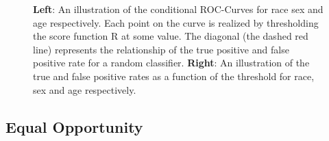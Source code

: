 \documentclass[11pt, fleqn, titlepage]{article}
\begin{document}
\begin{figure}[H]
\begin{subfigure}{0.5\textwidth}
		\end{subfigure}
		\caption{\textbf{Left}: An illustration of the conditional ROC-Curves for race sex and age respectively. Each point on the curve is realized by thresholding the score function R at some value. The diagonal (the dashed red line) represents the relationship of the true positive and false positive rate for a random classifier. \textbf{Right}: An illustration of the true and false positive rates as a function of the threshold for race, sex and age respectively.}
		\label{fig:roc-curve}
	\end{figure}

		
	\subsection{Equal Opportunity}\label{equalOpportunity}
	
\end{document}
